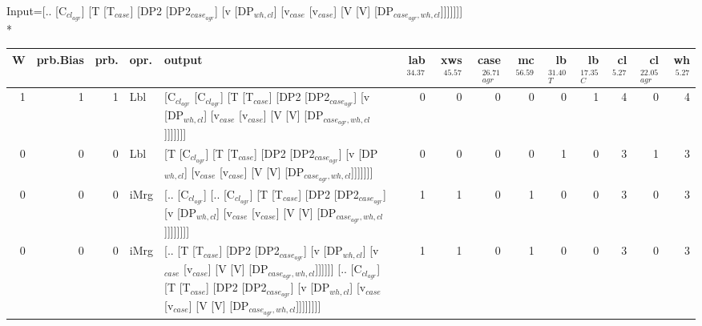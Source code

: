 \begingroup\scriptsize Input=[.. [C$_{cl_{agr}}$] [T [T$_{case}$] [DP2 [DP2$_{case_{agr}}$] [v [DP$_{wh,cl}$] [v$_{case}$ [v$_{case}$] [V [V] [DP$_{case_{agr},wh,cl}$]]]]]]]\\*
\begin{tabularx}{\linewidth}{rrrlXrrrrrrrrr}
\hline
   W &   prb.Bias &   prb. & opr.   & output                                                                                                                                                                                                             &   lab$^{34.37}$ &   xws$^{45.57}$ &   case$_{agr}^{26.71}$ &   mc$^{56.59}$ &   lb$_{T}^{31.40}$ &   lb$_{C}^{17.35}$ &   cl$^{5.27}$ &   cl$_{agr}^{22.05}$ &   wh$^{5.27}$ \\
\hline
   1 &       1 &   1 & Lbl  & [C$_{cl_{agr}}$ [C$_{cl_{agr}}$] [T [T$_{case}$] [DP2 [DP2$_{case_{agr}}$] [v [DP$_{wh,cl}$] [v$_{case}$ [v$_{case}$] [V [V] [DP$_{case_{agr},wh,cl}$]]]]]]]                                                                                               &             0 &             0 &                  0 &            0 &              0 &              1 &        4 &             0 &        4 \\
   0 &       0 &   0 & Lbl  & [T [C$_{cl_{agr}}$] [T [T$_{case}$] [DP2 [DP2$_{case_{agr}}$] [v [DP$_{wh,cl}$] [v$_{case}$ [v$_{case}$] [V [V] [DP$_{case_{agr},wh,cl}$]]]]]]]                                                                                                      &             0 &             0 &                  0 &            0 &              1 &              0 &        3 &             1 &        3 \\
   0 &       0 &   0 & iMrg & [.. [C$_{cl_{agr}}$] [.. [C$_{cl_{agr}}$] [T [T$_{case}$] [DP2 [DP2$_{case_{agr}}$] [v [DP$_{wh,cl}$] [v$_{case}$ [v$_{case}$] [V [V] [DP$_{case_{agr},wh,cl}$]]]]]]]]                                                                                     &             1 &             1 &                  0 &            1 &              0 &              0 &        3 &             0 &        3 \\
   0 &       0 &   0 & iMrg & [.. [T [T$_{case}$] [DP2 [DP2$_{case_{agr}}$] [v [DP$_{wh,cl}$] [v$_{case}$ [v$_{case}$] [V [V] [DP$_{case_{agr},wh,cl}$]]]]]] [.. [C$_{cl_{agr}}$] [T [T$_{case}$] [DP2 [DP2$_{case_{agr}}$] [v [DP$_{wh,cl}$] [v$_{case}$ [v$_{case}$] [V [V] [DP$_{case_{agr},wh,cl}$]]]]]]]] &             1 &             1 &                  0 &            1 &              0 &              0 &        3 &             0 &        3 \\

\end{tabularx}
